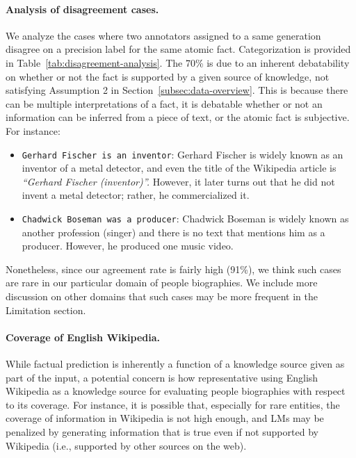 \documentclass[11pt]{article}
\begin{document}
\paragraph{Analysis of disagreement cases.}
We analyze the cases where two annotators assigned to a same generation disagree on a precision label for the same atomic fact. Categorization is provided in Table~\ref{tab:disagreement-analysis}. The 70\% is due to an inherent debatability on whether or not the fact is supported by a given source of knowledge, not satisfying Assumption 2 in Section~\ref{subsec:data-overview}.
This is because there can be multiple interpretations of a fact, it is debatable whether or not an information can be inferred from a piece of text, or the atomic fact is subjective. For instance:\vspace{-.3em}
\begin{itemize}[leftmargin=15pt]\itemsep -.2em
    \item \texttt{Gerhard Fischer is an inventor}: Gerhard Fischer is widely known as an inventor of a metal detector, and even the title of the Wikipedia article is \emph{``Gerhard Fischer (inventor)''.}
    However, it later turns out that he did not invent a metal detector; rather, he commercialized it.
    \item \texttt{Chadwick Boseman was a producer}: Chadwick Boseman is widely known as another profession (singer) and there is no text that mentions him as a producer. However, he produced one music video.
\end{itemize}
Nonetheless, since our agreement rate is fairly high (91\%), we think such cases are rare in our particular domain of people biographies. We include more discussion on other domains that such cases may be more frequent in the Limitation section.


\paragraph{Coverage of English Wikipedia.}
While factual prediction is inherently a function of a knowledge source given as part of the input, a potential concern is how representative using English Wikipedia as a knowledge source for evaluating people biographies with respect to its coverage. For instance, it is possible that, especially for rare entities, the coverage of information in Wikipedia is not high enough, and LMs may be penalized by generating information that is true even if not supported by Wikipedia (i.e., supported by other sources on the web).
\end{document}
